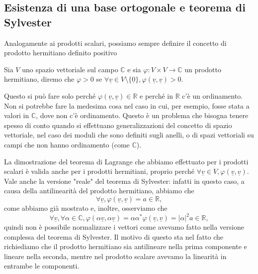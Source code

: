 \subsection{Esistenza di una base ortogonale e teorema di Sylvester}

Analogamente ai prodotti scalari, possiamo sempre definire il concetto di prodotto hermitiano definito positivo
\begin{definition}
    Sia $V$ uno spazio vettoriale sul campo $\mathbb{C}$ e sia $\varphi: V \times V \to \mathbb{C}$ un prodotto hermitiano, diremo che $\varphi > 0$ se $\forall \underline{v} \in V \setminus \{ \underline{0} \}, \varphi(\underline{v}, \underline{v}) > 0$.
\end{definition}
\begin{remark}
    Questo si può fare solo perché $\varphi(\underline{v}, \underline{v}) \in \mathbb{R}$ e perché in $\mathbb{R}$ c'è un ordinamento. Non si potrebbe fare la medesima cosa nel caso in cui, per esempio, fosse stata a valori in $\mathbb{C}$, dove non c'è ordinamento. Questo è un problema che bisogna tenere spesso di conto quando si effettuano generalizzazioni del concetto di spazio vettoriale, nel caso dei moduli che sono definiti sugli anelli, o di spazi vettoriali su campi che non hanno ordinamento (come $\mathbb{C}$).
\end{remark}
La dimostrazione del teorema di Lagrange che abbiamo effettuato per i prodotti scalari è valida anche per i prodotti hermitiani, proprio perché $\forall \underline{v} \in V, \varphi(\underline{v}, \underline{v})$.
Vale anche la versione "reale" del teorema di Sylvester: infatti in questo caso, a causa della antilinearità del prodotto hermitiano, abbiamo che
$$
    \forall \underline{v}, \varphi(\underline{v}, \underline{v}) = a \in \mathbb{R},
$$
come abbiamo già mostrato e, inoltre, osserviamo che
$$
    \forall \underline{v}, \forall \alpha \in \mathbb{C}, \varphi(\alpha \underline{v}, \alpha \underline{v}) = \alpha \alpha^* \varphi(\underline{v}, \underline{v}) = |\alpha|^2 a \in \mathbb{R},
$$
quindi non è possibile normalizzare i vettori come avevamo fatto nella versione complessa del teorema di Sylvester. Il motivo di questo sta nel fatto che richiediamo che il prodotto hermitiano sia antilineare nella prima componente e lineare nella seconda, mentre nel prodotto scalare avevamo la linearità in entrambe le componenti.